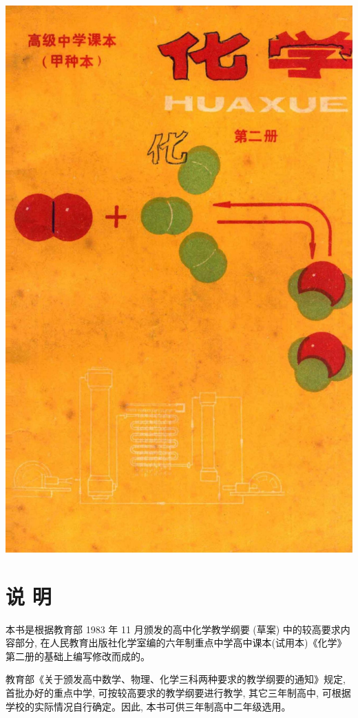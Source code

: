 \documentclass[10pt]{article}
\begin{document}
\begin{center}
\includegraphics[max width=1.0\textwidth]{images/01912d13-9986-7822-a012-3f3f7be99dcb_1_875799.jpg}
\end{center}

\section*{说 明}

本书是根据教育部 1983 年 11 月颁发的高中化学教学纲要 (草案) 中的较高要求内容部分, 在人民教育出版社化学室编的六年制重点中学高中课本(试用本)《化学》第二册的基础上编写修改而成的。

教育部《关于颁发高中数学、物理、化学三科两种要求的教学纲要的通知》规定, 首批办好的重点中学, 可按较高要求的教学纲要进行教学, 其它三年制高中, 可根据学校的实际情况自行确定。因此, 本书可供三年制高中二年级选用。
\end{document}
